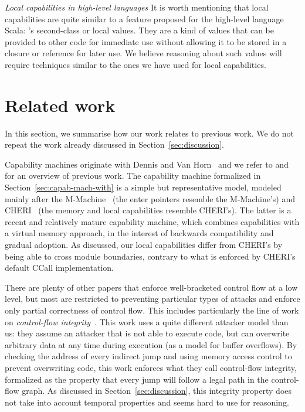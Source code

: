 \documentclass[compsoc,conference,letterpaper,fleqn]{IEEEtran}
\newcommand\lau[1]{{\color{purple} \sf \footnotesize {LS: #1}}\\}
\renewcommand\lau[1]{}
\begin{document}
\emph{Local capabilities in high-level languages} It is worth mentioning that
local capabilities are quite similar to a feature proposed for the high-level
language Scala: \citet{osvald_gentrification_2016}'s second-class or local
values. They are a kind of values that can be provided to other code for
immediate use without allowing it to be stored in a closure or reference for
later use. We believe reasoning about such values will require techniques similar 
to the ones we have used for local capabilities.

\section{Related work}
\label{sec:related-work}

In this section, we summarise how our work relates to previous work. We do not
repeat the work already discussed in Section~\ref{sec:discussion}.

Capability machines originate with Dennis and Van
Horn~\cite{Dennis:1966:PSM:365230.365252} and we refer to
\citet{Levy1984capability} and \citet{Watson2015Cheri} for an overview
of previous work. The capability machine formalized in
Section~\ref{sec:capab-mach-with} is a simple but representative
model, modeled mainly after the
M-Machine~\cite{Carter:1994:HSF:195473.195579} (the enter pointers
resemble the M-Machine's) and
CHERI~\cite{Watson2015Cheri,Woodruff:2014:CCM:2665671.2665740} (the
memory and local capabilities resemble CHERI's). The latter is a
recent and relatively mature capability machine, which combines
capabilities with a virtual memory approach, in the interest of
backwards compatibility and gradual adoption. As discussed, our local
capabilities differ from CHERI's by being able to cross module boundaries, 
contrary to what is enforced by CHERI's default CCall implementation.

There are plenty of other papers\lau{If there are plenty, then I guess we should cite more than one?}
 that enforce well-bracketed control flow at a
low level, but most are restricted to preventing particular types of attacks and
enforce only partial correctness of control flow. This includes particularly the
line of work on \emph{control-flow integrity}~\citep{abadi_control-flow_2005}.
This work uses a quite different attacker model than us: they assume an attacker
that is not able to execute code, but can overwrite arbitrary data at any time
during execution (as a model for buffer overflows). By checking the address of
every indirect jump and using memory access control to prevent overwriting code,
this work enforces what they call control-flow integrity, formalized as the
property that every jump will follow a legal path in the control-flow graph.
As discussed in Section~\ref{sec:discussion}, this integrity property does not
take into account temporal properties and seems hard to use for reasoning. 
\end{document}
